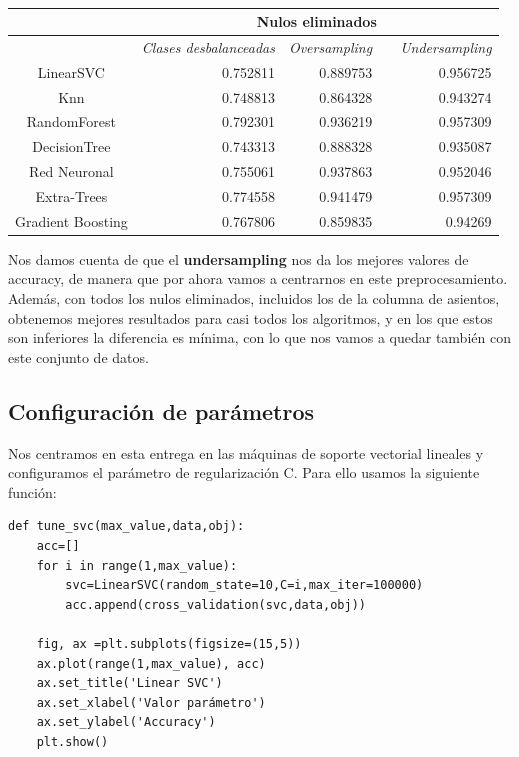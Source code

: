 \documentclass[a4paper,11pt]{article}
\begin{document}
\begin{table}[htbp]
	\caption{}\begin{center}
		\begin{tabular}{|c|r|r|l|r|}
			\hline
			\multicolumn{1}{|l|}{} & \multicolumn{ 4}{c|}{\textbf{Nulos eliminados}} \\ \hline
			\multicolumn{1}{|l|}{} & \multicolumn{1}{l|}{\textit{Clases desbalanceadas}} & \multicolumn{1}{l|}{\textit{Oversampling}} & \textit{} & \multicolumn{1}{l|}{\textit{Undersampling}} \\ \hline
				LinearSVC & 0.752811 & 0.889753 & & 0.956725 \\ \hline
			Knn & 0.748813 & 0.864328 & & 0.943274 \\ \hline
			RandomForest & 0.792301 & 0.936219 & & 0.957309 \\ \hline
			DecisionTree & 0.743313 & 0.888328 & & 0.935087 \\ \hline
			Red Neuronal & 0.755061 & 0.937863 & & 0.952046 \\ \hline
			Extra-Trees & 0.774558 & 0.941479 & & 0.957309 \\ \hline
			Gradient Boosting & 0.767806 & 0.859835 & & 0.94269 \\ \hline
	\end{tabular}\end{center}
	\label{}
\end{table}

Nos damos cuenta de que el \textbf{undersampling} nos da los mejores valores de accuracy, de manera que por ahora vamos a centrarnos en este preprocesamiento. Además, con todos los nulos eliminados, incluidos los de la columna de asientos, obtenemos mejores resultados para casi todos los algoritmos, y en los que estos son inferiores la diferencia es mínima, con lo que nos vamos a quedar también con este conjunto de datos. 

\subsection{Configuración de parámetros}

Nos centramos en esta entrega en las máquinas de soporte vectorial lineales y configuramos el parámetro de regularización C. Para ello usamos la siguiente función:
\begin{verbatim}
def tune_svc(max_value,data,obj):
	acc=[]
	for i in range(1,max_value):
		svc=LinearSVC(random_state=10,C=i,max_iter=100000)
		acc.append(cross_validation(svc,data,obj))
	
	fig, ax =plt.subplots(figsize=(15,5))
	ax.plot(range(1,max_value), acc)
	ax.set_title('Linear SVC')
	ax.set_xlabel('Valor parámetro')
	ax.set_ylabel('Accuracy')
	plt.show()
\end{verbatim}
\end{document}

